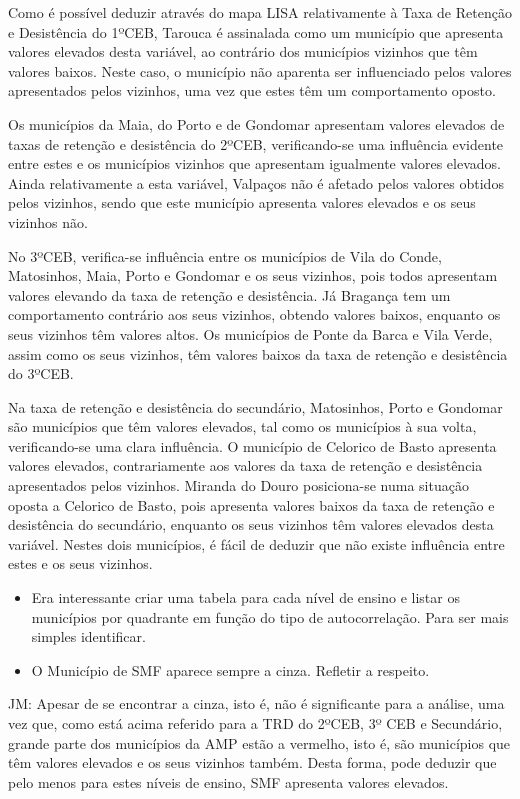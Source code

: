 \documentclass[
]{book}
\begin{document}
Como é possível deduzir através do mapa LISA relativamente à Taxa de Retenção e Desistência do 1ºCEB, Tarouca é assinalada como um município que apresenta valores elevados desta variável, ao contrário dos municípios vizinhos que têm valores baixos. Neste caso, o município não aparenta ser influenciado pelos valores apresentados pelos vizinhos, uma vez que estes têm um comportamento oposto.

Os municípios da Maia, do Porto e de Gondomar apresentam valores elevados de taxas de retenção e desistência do 2ºCEB, verificando-se uma influência evidente entre estes e os municípios vizinhos que apresentam igualmente valores elevados. Ainda relativamente a esta variável, Valpaços não é afetado pelos valores obtidos pelos vizinhos, sendo que este município apresenta valores elevados e os seus vizinhos não.

No 3ºCEB, verifica-se influência entre os municípios de Vila do Conde, Matosinhos, Maia, Porto e Gondomar e os seus vizinhos, pois todos apresentam valores elevando da taxa de retenção e desistência. Já Bragança tem um comportamento contrário aos seus vizinhos, obtendo valores baixos, enquanto os seus vizinhos têm valores altos. Os municípios de Ponte da Barca e Vila Verde, assim como os seus vizinhos, têm valores baixos da taxa de retenção e desistência do 3ºCEB.

Na taxa de retenção e desistência do secundário, Matosinhos, Porto e Gondomar são municípios que têm valores elevados, tal como os municípios à sua volta, verificando-se uma clara influência. O município de Celorico de Basto apresenta valores elevados, contrariamente aos valores da taxa de retenção e desistência apresentados pelos vizinhos. Miranda do Douro posiciona-se numa situação oposta a Celorico de Basto, pois apresenta valores baixos da taxa de retenção e desistência do secundário, enquanto os seus vizinhos têm valores elevados desta variável. Nestes dois municípios, é fácil de deduzir que não existe influência entre estes e os seus vizinhos.

\begin{itemize}
\item
  Era interessante criar uma tabela para cada nível de ensino e listar os municípios por quadrante em função do tipo de autocorrelação. Para ser mais simples identificar.
\item
  O Município de SMF aparece sempre a cinza. Refletir a respeito.
\end{itemize}

JM: Apesar de se encontrar a cinza, isto é, não é significante para a análise, uma vez que, como está acima referido para a TRD do 2ºCEB, 3º CEB e Secundário, grande parte dos municípios da AMP estão a vermelho, isto é, são municípios que têm valores elevados e os seus vizinhos também. Desta forma, pode deduzir que pelo menos para estes níveis de ensino, SMF apresenta valores elevados.
\end{document}

